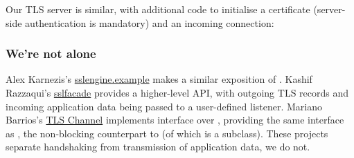 \noindent
Our TLS server is similar, with additional code to initialise a certificate (server-side authentication is mandatory) 
and an incoming connection:





\lstset{widthgobble=1*1}


\subsubsection*{We're not alone}

Alex Karnezis's \href{https://github.com/alkarn/sslengine.example}{sslengine.example} makes a 
similar exposition of . 
%
Kashif Razzaqui's \href{https://github.com/kashifrazzaqui/sslfacade/}{sslfacade} provides a 
higher-level API, with outgoing TLS records and incoming application data being passed to 
a user-defined listener.
%
Mariano Barrios's \href{https://github.com/marianobarrios/tls-channel}{TLS Channel} implements
interface  over , providing the same interface as 
, the non-blocking counterpart to  (of which 
is a subclass).
%
These projects separate handshaking from transmission of application data, we do not.
